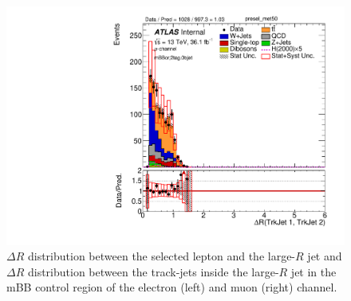 \begin{figure}[!h]
\begin{center}
\includegraphics[scale=0.33]{./figures/boosted/PlotByChannels/DataMC_2tag_0bjet_mbbcr_muon_presel_met50_drbtrkjet1btrkjet2}                                                                         
\caption{$\Delta R$ distribution between the selected lepton and the large-$R$ jet and $\Delta R$ distribution between the track-jets inside
the large-$R$ jet in the mBB control region of the electron (left) and muon (right) channel.}
\label{fig:boosted_mbbcrleptons_whad_dr}
\end{center}
\end{figure}




